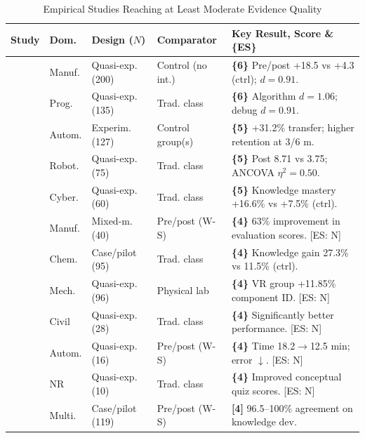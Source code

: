 \footnotesize
\begin{table}[!t]
	\renewcommand{\arraystretch}{1.2}
	\setlength{\tabcolsep}{2.2pt} 
	\caption{Empirical Studies Reaching at Least Moderate Evidence Quality}
	\label{tab:T2}
	\centering
	\scriptsize
	\begin{tabular}{@{} l l l p{1.3cm} p{3.5cm} @{}}
		\hline
	
		\textbf{Study} & \textbf{Dom.} & \textbf{Design ($N$)} & \textbf{Comparator} & \textbf{Key Result, Score \& \{ES\}} \\ \hline
		\cite{kwateng_enhancing_2026} & Manuf. & Quasi-exp. (200) & Control (no int.) & \textbf{\{6\}} Pre/post +18.5 vs +4.3 (ctrl); $d=0.91$. \\
		\cite{lu_digital_2025} & Prog. & Quasi-exp. (135) & Trad. class & \textbf{\{6\}} Algorithm $d=1.06$; debug $d=0.91$. \\
		\cite{lin_visfactory_2025} & Autom. & Experim. (127) & Control group(s) & \textbf{\{5\}} +31.2\% transfer; higher retention at 3/6 m. \\
		\cite{tarng_application_2024} & Robot. & Quasi-exp. (75) & Trad. class & \textbf{\{5\}} Post 8.71 vs 3.75; ANCOVA $\eta^{2}=0.50$. \\
		\cite{wang_innovative_2025} & Cyber. & Quasi-exp. (60) & Trad. class & \textbf{\{5\}} Knowledge mastery +16.6\% vs +7.5\% (ctrl). \\
		\cite{khan_teaching_2026} & Manuf. & Mixed-m. (40) & Pre/post (W-S) & \textbf{\{4\}} 63\% improvement in evaluation scores. [ES: N] \\
		\cite{li_exploration_2025} & Chem. & Case/pilot (95) & Trad. class & \textbf{\{4\}} Knowledge gain 27.3\% vs 11.5\% (ctrl). \\
		\cite{liljaniemi_enhancing_2025} & Mech. & Quasi-exp. (96) & Physical lab & \textbf{\{4\}} VR group +11.85\% component ID. [ES: N] \\
		\cite{ning_exploration_2024} & Civil & Quasi-exp. (28) & Trad. class & \textbf{\{4\}} Significantly better performance. [ES: N] \\
		\cite{ortiz_digital_2025} & Autom. & Quasi-exp. (16) & Pre/post (W-S) & \textbf{\{4\}} Time 18.2$\rightarrow$12.5 min; error $\downarrow$. [ES: N] \\
		\cite{park_ar_2026} & NR & Quasi-exp. (10) & Trad. class & \textbf{\{4\}} Improved conceptual quiz scores. [ES: N] \\
		\cite{alvarez_ariza_investigating_2026} & Multi. & Case/pilot (119) & Pre/post (W-S) & \textbf{[4]} 96.5–100\% agreement on knowledge dev. \\

\end{tabular}
\end{table}
